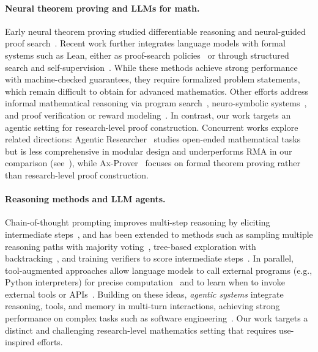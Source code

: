 \documentclass{article}
\newcommand{\modelname}{\textsc{RMA}\xspace}
\begin{document}
\paragraph{Neural theorem proving and LLMs for math.}
Early neural theorem proving studied differentiable reasoning and neural-guided proof search~\citep{rocktaschel2017end,LearningExplanatoryRules}. Recent work further integrates language models with formal systems such as Lean, either as proof-search policies~\citep{polu2020gpt} or through structured search and self-supervision~\citep{Yang2025LemmaHeadRA,shen2025real,han2022proof,lample2022hypertree,jiang2022draft}. While these methods achieve strong performance with machine-checked guarantees, they require formalized problem statements, which remain difficult to obtain for advanced mathematics. Other efforts address informal mathematical reasoning via program search~\citep{romera2024mathematical}, neuro-symbolic systems~\citep{trinh2024alphageometry}, and proof verification or reward modeling~\citep{collins2024evaluating,frieder2024mathematical,liao2024mario}. In contrast, our work targets an agentic setting for research-level proof construction. Concurrent works explore related directions: Agentic Researcher~\citep{zimmer2026agenticresearcherpracticalguide} studies open-ended mathematical tasks but is less comprehensive in modular design and underperforms \modelname in our comparison (see~), while Ax-Prover~\citep{breen2025axproverdeepreasoningagentic} focuses on formal theorem proving rather than research-level proof construction.
\vspace{-7pt}
\paragraph{Reasoning methods and LLM agents.}
Chain-of-thought prompting improves multi-step reasoning by eliciting intermediate steps~\citep{wei2022chain}, and has been extended to methods such as sampling multiple reasoning paths with majority voting~\citep{wang2022self}, tree-based exploration with backtracking~\citep{yao2023tree}, and training verifiers to score intermediate steps~\citep{lightman2023verify}. In parallel, tool-augmented approaches allow language models to call external programs (e.g., Python interpreters) for precise computation~\citep{chen2022pot,gao2023pal} and to learn when to invoke external tools or APIs~\citep{schick2023toolformer,wu2022autoformalization}. Building on these ideas, \emph{agentic systems} integrate reasoning, tools, and memory in multi-turn interactions, achieving strong performance on complex tasks such as software engineering~\citep{yao2022react,wu2023autogen,yang2024sweagent,wang2024openhands,novikov2025alphaevolvecodingagentscientific,novikov2025alphaevolvecodingagentscientific,han2025exploring,zhou2025step}. Our work targets a distinct and challenging research-level mathematics setting that requires use-inspired efforts.
\end{document}

